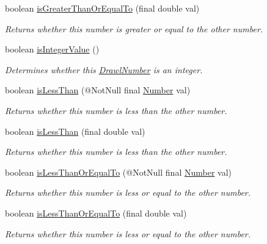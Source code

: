 \begin{DoxyCompactItemize}
boolean \hyperlink{interfacecom_1_1aarrelaakso_1_1drawl_1_1_number_ae41d4d8a98ecc4a8e9e3be80d1a6b291}{is\+Greater\+Than\+Or\+Equal\+To} (final double val)
\begin{DoxyCompactList}\small\item\em Returns whether this number is greater or equal to the other number. \end{DoxyCompactList}\item 
boolean \hyperlink{interfacecom_1_1aarrelaakso_1_1drawl_1_1_number_a33d0b6d8f3aeb0ccb9f710739c80f6e7}{is\+Integer\+Value} ()
\begin{DoxyCompactList}\small\item\em Determines whether this \hyperlink{classcom_1_1aarrelaakso_1_1drawl_1_1_drawl_number}{Drawl\+Number} is an integer. \end{DoxyCompactList}\item 
boolean \hyperlink{interfacecom_1_1aarrelaakso_1_1drawl_1_1_number_acc7fec3a209cb27e09a45f17ed9fd4e1}{is\+Less\+Than} (@Not\+Null final \hyperlink{interfacecom_1_1aarrelaakso_1_1drawl_1_1_number}{Number} val)
\begin{DoxyCompactList}\small\item\em Returns whether this number is less than the other number. \end{DoxyCompactList}\item 
boolean \hyperlink{interfacecom_1_1aarrelaakso_1_1drawl_1_1_number_a82b299428c48204fb05229dbea2b439b}{is\+Less\+Than} (final double val)
\begin{DoxyCompactList}\small\item\em Returns whether this number is less than the other number. \end{DoxyCompactList}\item 
boolean \hyperlink{interfacecom_1_1aarrelaakso_1_1drawl_1_1_number_a195d37075fcef873df2907194e794836}{is\+Less\+Than\+Or\+Equal\+To} (@Not\+Null final \hyperlink{interfacecom_1_1aarrelaakso_1_1drawl_1_1_number}{Number} val)
\begin{DoxyCompactList}\small\item\em Returns whether this number is less or equal to the other number. \end{DoxyCompactList}\item 
boolean \hyperlink{interfacecom_1_1aarrelaakso_1_1drawl_1_1_number_a99ddc795a01b241e97345cfd6b85e00b}{is\+Less\+Than\+Or\+Equal\+To} (final double val)
\begin{DoxyCompactList}\small\item\em Returns whether this number is less or equal to the other number. \end{DoxyCompactList}\item 

\end{DoxyCompactItemize}
